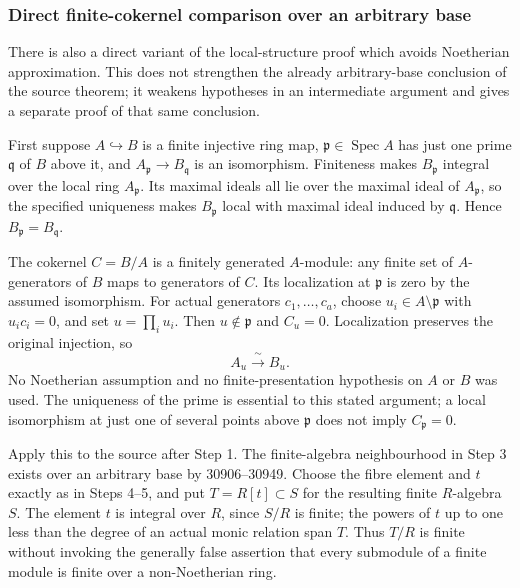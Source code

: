 \subsubsection{Direct finite-cokernel comparison over an arbitrary base}\label{direct-finite-cokernel-comparison-over-an-arbitrary-base}

There is also a direct variant of the local-structure proof which avoids Noetherian approximation. This does not strengthen the already arbitrary-base conclusion of the source theorem; it weakens hypotheses in an intermediate argument and gives a separate proof of that same conclusion.

First suppose \(A\hookrightarrow B\) is a finite injective ring map, \(\mathfrak p\in\operatorname{Spec}A\) has just one prime \(\mathfrak q\) of \(B\) above it, and \(A_{\mathfrak p}\to B_{\mathfrak q}\) is an isomorphism. Finiteness makes \(B_{\mathfrak p}\) integral over the local ring \(A_{\mathfrak p}\). Its maximal ideals all lie over the maximal ideal of \(A_{\mathfrak p}\), so the specified uniqueness makes \(B_{\mathfrak p}\) local with maximal ideal induced by \(\mathfrak q\). Hence \(B_{\mathfrak p}=B_{\mathfrak q}\).

The cokernel \(C=B/A\) is a finitely generated \(A\)-module: any finite set of \(A\)-generators of \(B\) maps to generators of \(C\). Its localization at \(\mathfrak p\) is zero by the assumed isomorphism. For actual generators \(c_1,\ldots,c_a\), choose \(u_i\in A\setminus\mathfrak p\) with \(u_ic_i=0\), and set \(u=\prod_i u_i\). Then \(u\notin\mathfrak p\) and \(C_u=0\). Localization preserves the original injection, so \[
A_u\xrightarrow{\;\sim\;}B_u.
\] No Noetherian assumption and no finite-presentation hypothesis on \(A\) or \(B\) was used. The uniqueness of the prime is essential to this stated argument; a local isomorphism at just one of several points above \(\mathfrak p\) does not imply \(C_{\mathfrak p}=0\).

Apply this to the source after Step 1. The finite-algebra neighbourhood in Step 3 exists over an arbitrary base by 30906--30949. Choose the fibre element and \(t\) exactly as in Steps 4--5, and put \(T=R[t]\subset S\) for the resulting finite \(R\)-algebra \(S\). The element \(t\) is integral over \(R\), since \(S/R\) is finite; the powers of \(t\) up to one less than the degree of an actual monic relation span \(T\). Thus \(T/R\) is finite without invoking the generally false assertion that every submodule of a finite module is finite over a non-Noetherian ring.

